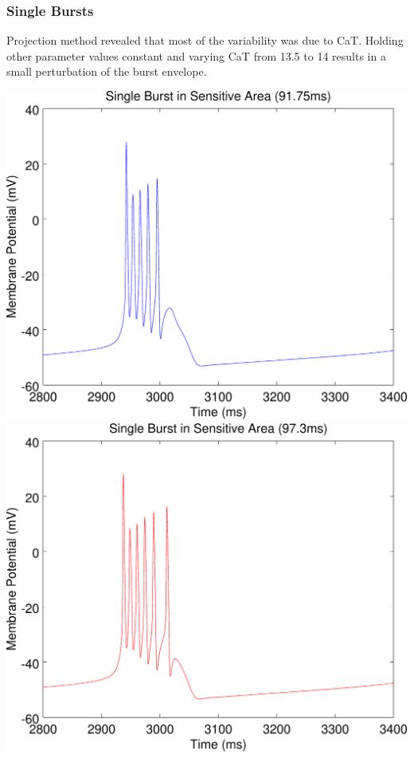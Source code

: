 \documentclass{beamer}
\theoremstyle{plain}
\theoremstyle{definition}
\begin{document}
\begin{frame}\frametitle{Single Bursts}
  Projection method revealed that most of the variability was due to CaT. Holding other parameter values constant and varying CaT from 13.5 to 14 results in a small perturbation of the burst envelope.
  \begin{center}
    \includegraphics[scale=.32]{SingleBurst13p5.pdf}%
    \includegraphics[scale=.32]{SingleBurst14.pdf}%
  \end{center}
\end{frame}
\end{document}
